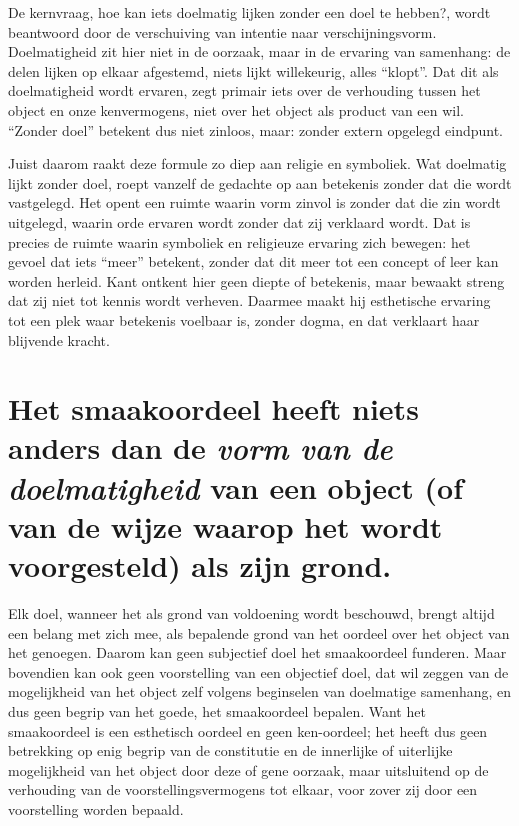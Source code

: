 \begin{mdframed}[leftmargin=0pt,rightmargin=0pt,backgroundcolor=blue!6,linecolor=white,innertopmargin=6pt,innerbottommargin=6pt]
De kernvraag, hoe kan iets doelmatig lijken zonder een doel te hebben?, wordt beantwoord door de verschuiving van intentie naar verschijningsvorm. Doelmatigheid zit hier niet in de oorzaak, maar in de ervaring van samenhang: de delen lijken op elkaar afgestemd, niets lijkt willekeurig, alles “klopt”. Dat dit als doelmatigheid wordt ervaren, zegt primair iets over de verhouding tussen het object en onze kenvermogens, niet over het object als product van een wil. “Zonder doel” betekent dus niet zinloos, maar: zonder extern opgelegd eindpunt.

Juist daarom raakt deze formule zo diep aan religie en symboliek. Wat doelmatig lijkt zonder doel, roept vanzelf de gedachte op aan betekenis zonder dat die wordt vastgelegd. Het opent een ruimte waarin vorm zinvol is zonder dat die zin wordt uitgelegd, waarin orde ervaren wordt zonder dat zij verklaard wordt. Dat is precies de ruimte waarin symboliek en religieuze ervaring zich bewegen: het gevoel dat iets “meer” betekent, zonder dat dit meer tot een concept of leer kan worden herleid. Kant ontkent hier geen diepte of betekenis, maar bewaakt streng dat zij niet tot kennis wordt verheven. Daarmee maakt hij esthetische ervaring tot een plek waar betekenis voelbaar is, zonder dogma, en dat verklaart haar blijvende kracht.
\end{mdframed}

\section{Het smaakoordeel heeft niets anders dan de \emph{vorm van de doelmatigheid} van een object (of van de wijze waarop het wordt voorgesteld) als zijn grond.}

Elk doel, wanneer het als grond van voldoening wordt beschouwd, brengt altijd een belang met zich mee, als bepalende grond van het oordeel over het object van het genoegen. Daarom kan geen subjectief doel het smaakoordeel funderen. Maar bovendien kan ook geen voorstelling van een objectief doel, dat wil zeggen van de mogelijkheid van het object zelf volgens beginselen van doelmatige samenhang, en dus geen begrip van het goede, het smaakoordeel bepalen. Want het smaakoordeel is een esthetisch oordeel en geen ken-oordeel; het heeft dus geen betrekking op enig begrip van de constitutie en de innerlijke of uiterlijke mogelijkheid van het object door deze of gene oorzaak, maar uitsluitend op de verhouding van de voorstellingsvermogens tot elkaar, voor zover zij door een voorstelling worden bepaald.


